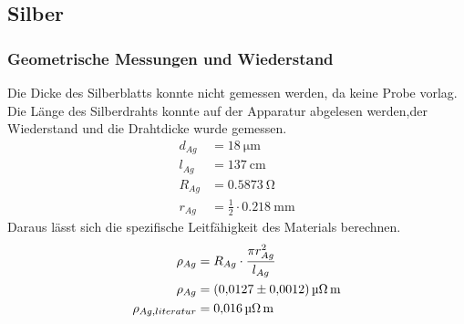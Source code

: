 \subsection{Silber}
\subsubsection{Geometrische Messungen und Wiederstand}
Die Dicke des Silberblatts konnte nicht gemessen werden, da keine Probe vorlag.
Die Länge des Silberdrahts konnte auf der Apparatur abgelesen werden,der Wiederstand und die Drahtdicke wurde gemessen.
\begin{align*}
    d_{Ag} &= \SI{18}{\micro \meter} \\
    l_{Ag} &= \SI{137}{\centi \meter}\\
    R_{Ag} &= \SI{0.5873}{\ohm}\\
    r_{Ag} &= \frac{1}{2}\cdot \SI{0,218}{\milli \meter}
\end{align*}
Daraus lässt sich die spezifische Leitfähigkeit des Materials berechnen.
\begin{align*}
    \rho_{Ag} &= R_{Ag}\cdot \frac{\pi r_{Ag}^2}{l_{Ag}}\\
    \rho_{Ag} &= \SI{0,0127 \pm 0,0012}{\micro \ohm \meter}\\
    \rho_{Ag,literatur} &= \SI{0,016}{\micro \ohm \meter} %
\end{align*}

